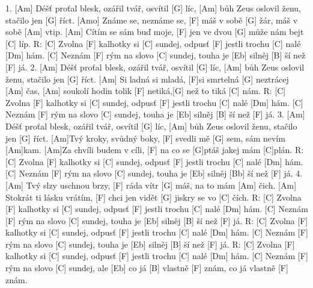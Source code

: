 
1.
[Am] Déšť proťal blesk, ozářil tvář, osvítil [G] líc,
[Am] bůh Zeus oslovil ženu, stačilo jen [G] říct.
[Amo] Známe se, neznáme se, [F] máš v sobě [G] žár, máš v sobě [Am] vtip.
[Am] Cítím se sám buď moje, [F] jen ve dvou [G] může nám bejt [C] líp.
R:
[C] Zvolna [F] kalhotky si [C] sundej, odpusť [F] jestli trochu [C] nalé [Dm] hám.
[C] Neznám [F] rým na slovo [C] sundej, touha je [Eb] silněj [B] ší než [F] já.
2.
[Am] Déšť proťal blesk, ozářil tvář, osvítil [G] líc,
[Am] bůh Zeus oslovil ženu, stačilo jen [G] říct.
[Am] Si ladná si mladá, [F]si smrtelná [G] neztrácej [Am] čas,
[Am] soukolí hodin tolik [F] netiká,[G] než to tiká [C] nám.
R:
[C] Zvolna [F] kalhotky si [C] sundej, odpusť [F] jestli trochu [C] nalé [Dm] hám.
[C] Neznám [F] rým na slovo [C] sundej, touha je [Eb] silněj [B] ší než [F] já.
3.
[Am] Déšť proťal blesk, ozářil tvář, osvítil [G] líc,
[Am] bůh Zeus oslovil ženu, stačilo jen [G] říct.
[Am]Tvý kroky, svůdný boky, [F] svedli mě [G] sem, sám nevím [Am]kam.
[Am]Za chvíli budem v cíli, [F] na co se [G]ptáš jakej mám [C]plán.
R:
[C] Zvolna [F] kalhotky si [C] sundej, odpusť [F] jestli trochu [C] nalé [Dm] hám.
[C] Neznám [F] rým na slovo [C] sundej, touha je [Eb] silněj [Bb] ší než [F] já.
4.
[Am] Tvý slzy uschnou brzy, [F] ráda vítr [G] máš, na to mám [Am] čich.
[Am] Stokrát ti lásku vrátím, [F] chci jen vidět [G] jiskry se vo [C] čích.
R:
[C] Zvolna [F] kalhotky si [C] sundej, odpusť [F] jestli trochu [C] nalé [Dm] hám.
[C] Neznám [F] rým na slovo [C] sundej, touha je [Eb] silněj [B] ší než [F] já.
R:
[C] Zvolna [F] kalhotky si [C] sundej, odpusť [F] jestli trochu [C] nalé [Dm] hám.
[C] Neznám [F] rým na slovo [C] sundej, touha je [Eb] silněj [B] ší než [F] já.
R:
[C] Zvolna [F] kalhotky si [C] sundej, odpusť [F] jestli trochu [C] nalé [Dm] hám.
[C] Neznám [F] rým na slovo [C] sundej, ale [Eb] co já [B] vlastně [F] znám, co já vlastně [F] znám. 

